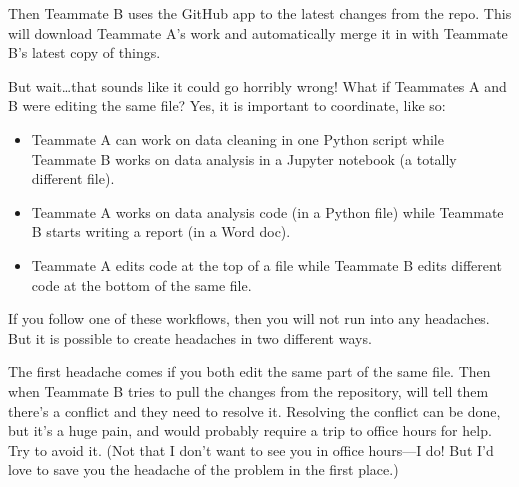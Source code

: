 \documentclass[letterpaper,10pt,english]{sphinxmanual}
\begin{document}
Then Teammate B uses the GitHub app to  the latest changes from the repo.  This will download Teammate A’s work and automatically merge it in with Teammate B’s latest copy of things.

But wait…that sounds like it could go horribly wrong!  What if Teammates A and B were editing the same file?  Yes, it is important to coordinate, like so:

\begin{itemize}
\item {} 
Teammate A can work on data cleaning in one Python script while Teammate B works on data analysis in a Jupyter notebook (a totally different file).

\item {} 
Teammate A works on data analysis code (in a Python file) while Teammate B starts writing a report (in a Word doc).

\item {} 
Teammate A edits code at the top of a file while Teammate B edits different code at the bottom of the same file.

\end{itemize}

If you follow one of these workflows, then you will not run into any headaches.  But it is possible to create headaches in two different ways.

The first headache comes if you both edit the same part of the same file.  Then when Teammate B tries to pull the changes from the repository,  will tell them there’s a conflict and they need to resolve it.  Resolving the conflict can be done, but it’s a huge pain, and would probably require a trip to office hours for help.  Try to avoid it.  (Not that I don’t want to see you in office hours—I do!  But I’d love to save you the headache of the problem in the first place.)
\end{document}
